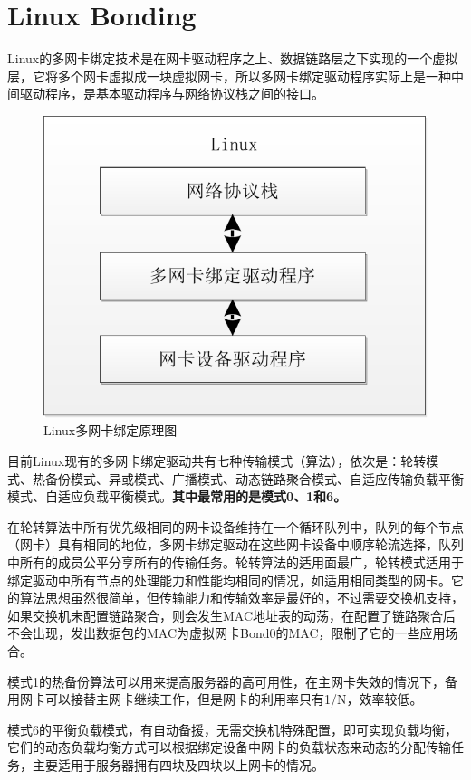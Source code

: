 
\section{Linux Bonding}


Linux的多网卡绑定技术是在网卡驱动程序之上、数据链路层之下实现的一个虚拟层，它将多个网卡虚拟成一块虚拟网卡，所以多网卡绑定驱动程序实际上是一种中间驱动程序，是基本驱动程序与网络协议栈之间的接口。


\begin{figure}
\includegraphics[keepaspectratio,width=0.4\paperwidth]{Pictures/LinuxBondingDriver.pdf} 
\caption{Linux多网卡绑定原理图}
 \label{fig:LinuxBondingDriver}
\end{figure}



目前Linux现有的多网卡绑定驱动共有七种传输模式（算法），依次是：轮转模式、热备份模式、异或模式、广播模式、动态链路聚合模式、自适应传输负载平衡模式、自适应负载平衡模式。\textbf{其中最常用的是模式0、1和6。}

在轮转算法中所有优先级相同的网卡设备维持在一个循环队列中，队列的每个节点（网卡）具有相同的地位，多网卡绑定驱动在这些网卡设备中顺序轮流选择，队列中所有的成员公平分享所有的传输任务。轮转算法的适用面最广，轮转模式适用于绑定驱动中所有节点的处理能力和性能均相同的情况，如适用相同类型的网卡。它的算法思想虽然很简单，但传输能力和传输效率是最好的，不过需要交换机支持，如果交换机未配置链路聚合，则会发生MAC地址表的动荡，在配置了链路聚合后不会出现，发出数据包的MAC为虚拟网卡Bond0的MAC，限制了它的一些应用场合。

模式1的热备份算法可以用来提高服务器的高可用性，在主网卡失效的情况下，备用网卡可以接替主网卡继续工作，但是网卡的利用率只有1/N，效率较低。
    
模式6的平衡负载模式，有自动备援，无需交换机特殊配置，即可实现负载均衡，它们的动态负载均衡方式可以根据绑定设备中网卡的负载状态来动态的分配传输任务，主要适用于服务器拥有四块及四块以上网卡的情况。
